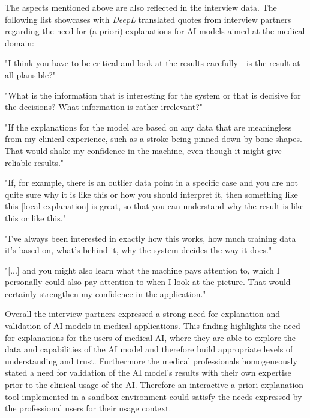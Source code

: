 \documentclass[11pt,a4paper,english]{scrreprt}
\begin{document}
The aspects mentioned above are also reflected in the interview data. The following list showcases with \textit{DeepL} \parencite{deepl} translated quotes from interview partners regarding the need for (a priori) explanations for AI models aimed at the medical domain:
\begin{displayquote}
    "I think you have to be critical and look at the results carefully - is the result at all plausible?"
\end{displayquote}
\begin{displayquote}
    "What is the information that is interesting for the system or that is decisive for the decisions? What information is rather irrelevant?"
\end{displayquote}
\begin{displayquote}
    "If the explanations for the model are based on any data that are meaningless from my clinical experience, such as a stroke being pinned down by bone shapes. That would shake my confidence in the machine, even though it might give reliable results."
\end{displayquote}
\begin{displayquote}
    "If, for example, there is an outlier data point in a specific case and you are not quite sure why it is like this or how you should interpret it, then something like this [local explanation] is great, so that you can understand why the result is like this or like this."
\end{displayquote}
\begin{displayquote}
    "I've always been interested in exactly how this works, how much training data it's based on, what's behind it, why the system decides the way it does."
\end{displayquote}
\begin{displayquote}
    "[...] and you might also learn what the machine pays attention to, which I personally could also pay attention to when I look at the picture. That would certainly strengthen my confidence in the application."
\end{displayquote}

Overall the interview partners expressed a strong need for explanation and validation of AI models in medical applications. This finding highlights the need for explanations for the users of medical AI, where they are able to explore the data and capabilities of the AI model and therefore build appropriate levels of understanding and trust. Furthermore the medical professionals homogeneously stated a need for validation of the AI model's results with their own expertise prior to the clinical usage of the AI. Therefore an interactive a priori explanation tool implemented in a sandbox environment could satisfy the needs expressed by the professional users for their usage context.
\end{document}
